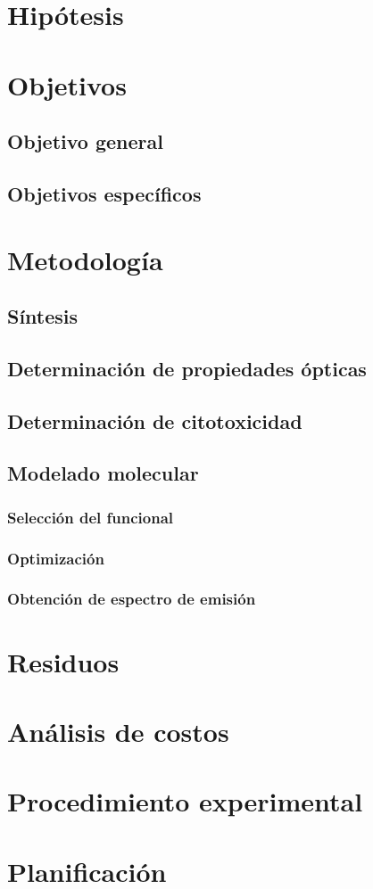 \documentclass[spanish,mexico]{scrartcl}
\begin{document}
\section{Hipótesis}
\section{Objetivos}
\subsection{Objetivo general}
\subsection{Objetivos específicos}
\section{Metodología}
\subsection{Síntesis}
\subsection{Determinación de propiedades ópticas}
\subsection{Determinación de citotoxicidad}
\subsection{Modelado molecular}
\subsubsection{Selección del funcional}
\subsubsection{Optimización}
\subsubsection{Obtención de espectro de emisión}
\section{Residuos}
\section{Análisis de costos}
\section{Procedimiento experimental}
\section{Planificación}

\printreactants{}
\printglossaries{}
\printbibliography{}

\listoftodos[Pendientes]
\end{document}
